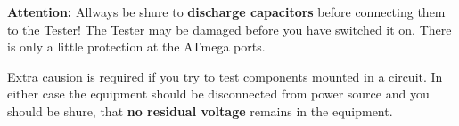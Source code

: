 \vspace{1cm}
\textbf{{\Large Attention:}} Allways be shure to {\bf discharge capacitors} before connecting them to the Tester!
The Tester may be damaged before you have switched it on. There is only a little protection at the ATmega ports.

Extra causion is required if you try to test components mounted in a circuit.
In either case the equipment should be disconnected from power source and you should be shure,
that {\bf no residual voltage} remains in the equipment.

